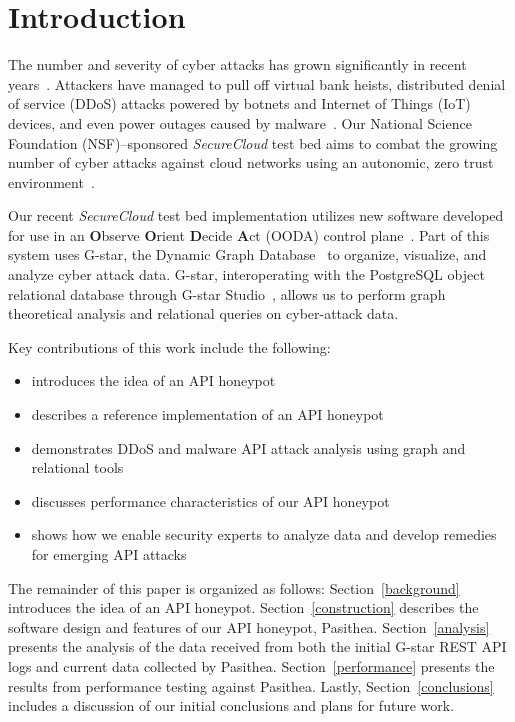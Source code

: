 
\section{Introduction} \label{intro}

The number and severity of cyber attacks has grown significantly in recent years~\cite{Symantec-Threat-Report,IBM-XForce-Report}. 
Attackers have managed to pull off virtual bank heists, distributed denial of service (DDoS) attacks powered by botnets and Internet of Things (IoT) devices, and even power outages caused by malware~\cite{IBM-XForce-Report}. 
Our National Science Foundation (NSF)--sponsored {\em SecureCloud} test bed aims to combat the growing number of cyber attacks against cloud networks using an autonomic, zero trust environment~\cite{7796146}.  

Our recent {\em SecureCloud} test bed implementation utilizes new software developed for use in an {\textbf O}bserve {\textbf O}rient {\textbf D}ecide {\textbf A}ct (OODA) control plane~\cite{something for OODA}.
Part of this system uses G-star, the Dynamic Graph Database~\cite{Labouseur-DAPD-2015} to organize, visualize, and analyze cyber attack data. 
G-star, interoperating with the PostgreSQL object relational database through G-star Studio~\cite{inroads-Labouseur16}, allows us to perform graph theoretical analysis and relational queries on cyber-attack data.  

Key contributions of this work include the following:
\begin{itemize}
   \item introduces the idea of an API honeypot
   \item describes a reference implementation of an API honeypot
   \item demonstrates DDoS and malware API attack analysis using graph and relational tools
   \item discusses performance characteristics of our API honeypot
   \item shows how we enable security experts to analyze data and develop remedies for emerging API attacks  
\end{itemize}

The remainder of this paper is organized as follows: 
Section~\ref{background} introduces the idea of an API honeypot. 
Section~\ref{construction} describes the software design and features of our API honeypot, Pasithea. 
Section~\ref{analysis} presents the analysis of the data received from both the initial G-star REST API logs and current data collected by Pasithea. 
Section~\ref{performance} presents the results from performance testing against Pasithea.
Lastly, Section~\ref{conclusions} includes a discussion of our initial conclusions and plans for future work.
